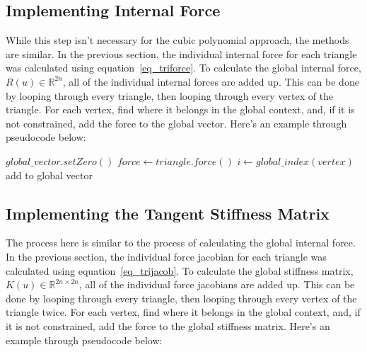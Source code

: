 \documentclass[twocolumn,10pt]{asme2ej}
\begin{document}
\subsection{Implementing Internal Force}

While this step isn't necessary for the cubic polynomial approach, the methods are similar. In the previous section, the individual internal force for each triangle was calculated using equation~\ref{eq_triforce}. To calculate the global internal force, $R(u) \in \mathbb{R}^{2n}$, all of the individual internal forces are added up. This can be done by looping through every triangle, then looping through every vertex of the triangle. For each vertex, find where it belongs in the global context, and, if it is not constrained, add the force to the global vector. Here's an example through pseudocode below:

\begin{algorithmic}[1]
        \State $global\_vector.setZero()$
         \State $force \gets triangle.force()$
                  \State $i \gets global\_index(vertex)$
                  \State add to global vector
              \EndIf
            \EndFor
        \EndFor
    \EndFunction
\end{algorithmic}

\subsection{Implementing the Tangent Stiffness Matrix}

The process here is similar to the process of calculating the global internal force. In the previous section, the individual force jacobian for each triangle was calculated using equation~\ref{eq_trijacob}. To calculate the global stiffness matrix, $K(u) \in \mathbb{R}^{2n \times 2n}$, all of the individual force jacobians are added up. This can be done by looping through every triangle, then looping through every vertex of the triangle twice. For each vertex, find where it belongs in the global context, and, if it is not constrained, add the force to the global stiffness matrix. Here's an example through pseudocode below:
\end{document}
